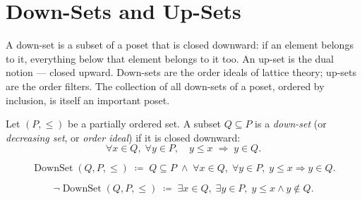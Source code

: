 
\section{Down-Sets and Up-Sets}
\label{sec:down-up-sets}

\begin{tcolorbox}[
  colback=gray!6,
  colframe=gray!40,
  arc=2pt,
  left=8pt, right=8pt, top=6pt, bottom=6pt,
  title={\small\textbf{Toolkit: Down-Sets and Up-Sets}},
  fonttitle=\small\bfseries
]
A down-set is a subset of a poset that is closed downward: if an element
belongs to it, everything below that element belongs to it too.  An up-set
is the dual notion — closed upward.  Down-sets are the order ideals of
lattice theory; up-sets are the order filters.  The collection of all
down-sets of a poset, ordered by inclusion, is itself an important poset.
\end{tcolorbox}


\begin{tcolorbox}[colback=defbox, colframe=defborder, arc=2pt,
  left=6pt, right=6pt, top=4pt, bottom=4pt,
  title={\small\textbf{Definition (Down-Set)}},
  fonttitle=\small\bfseries]
\begin{definition}
\label{def:down-set}
Let $(P, \leq)$ be a partially ordered set.  A subset $Q \subseteq P$ is
a \emph{down-set} (or \emph{decreasing set}, or \emph{order ideal}) if it
is closed downward:
\[
\forall x \in Q,\; \forall y \in P,\quad y \leq x \;\Longrightarrow\; y \in Q.
\]
\end{definition}
\end{tcolorbox}

\begin{remark*}
\[
\operatorname{DownSet}(Q, P, \leq)
\;\coloneqq\;
Q \subseteq P
\;\land\;
\forall x \in Q,\; \forall y \in P,\;
y \leq x \Rightarrow y \in Q.
\]
\end{remark*}

\begin{remark*}
\[
\neg\operatorname{DownSet}(Q, P, \leq)
\;\coloneqq\;
\exists x \in Q,\; \exists y \in P,\;
y \leq x \land y \notin Q.
\]
\end{remark*}

